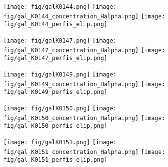 \begin{figure}[!ht]
\begin{center}
\setcaptionmargin{1cm}
\texttt{[image: fig/galK0144.png]}
\texttt{[image: fig/gal\_K0144\_concentration\_Halpha.png]}
\texttt{[image: fig/gal\_K0144\_perfis\_elip.png]}
\end{center}
\end{figure}


\begin{figure}[!ht]
\begin{center}
\setcaptionmargin{1cm}
\texttt{[image: fig/galK0147.png]}
\texttt{[image: fig/gal\_K0147\_concentration\_Halpha.png]}
\texttt{[image: fig/gal\_K0147\_perfis\_elip.png]}
\end{center}
\end{figure}


\begin{figure}[!ht]
\begin{center}
\setcaptionmargin{1cm}
\texttt{[image: fig/galK0149.png]}
\texttt{[image: fig/gal\_K0149\_concentration\_Halpha.png]}
\texttt{[image: fig/gal\_K0149\_perfis\_elip.png]}
\end{center}
\end{figure}


\begin{figure}[!ht]
\begin{center}
\setcaptionmargin{1cm}
\texttt{[image: fig/galK0150.png]}
\texttt{[image: fig/gal\_K0150\_concentration\_Halpha.png]}
\texttt{[image: fig/gal\_K0150\_perfis\_elip.png]}
\end{center}
\end{figure}


\begin{figure}[!ht]
\begin{center}
\setcaptionmargin{1cm}
\texttt{[image: fig/galK0151.png]}
\texttt{[image: fig/gal\_K0151\_concentration\_Halpha.png]}
\texttt{[image: fig/gal\_K0151\_perfis\_elip.png]}
\end{center}
\end{figure}


